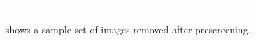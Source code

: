 \documentclass[letterpaper,10pt,english]{sphinxmanual}
\begin{document}
\begin{savenotes}\sphinxattablestart
\centering
{}
\sphinxthecaptionisattop
{}\label{\detokenize{common/user_manual/dataPrep:id2}}\label{\detokenize{common/user_manual/dataPrep:noiseeffect}}
\sphinxaftertopcaption
\begin{tabulary}{\linewidth}[t]{|T|T|}
\hline
\begin{sphinxfigure-in-table}
\centering

\noindent{}
\end{sphinxfigure-in-table}\relax
&\begin{sphinxfigure-in-table}
\centering

\noindent{}
\end{sphinxfigure-in-table}\relax
\\
\hline
\end{tabulary}
\par
\sphinxattableend\end{savenotes}

\sphinxAtStartPar
{} shows a sample set of images removed after prescreening.
\end{document}
